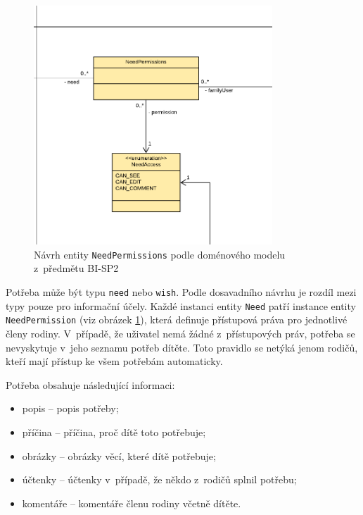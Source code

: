         \begin{figure}\centering
	        \includegraphics[width=0.8\textwidth]{pdfs/NeedPermissions1}
	        \caption[Návrh entity \texttt{NeedPermissions}]{Návrh entity \texttt{NeedPermissions} podle doménového modelu z~předmětu BI-SP2}\label{image:NeedPermissions1}
        \end{figure}
        Potřeba může být typu \verb|need| nebo \verb|wish|. Podle dosavadního návrhu je rozdíl mezi typy pouze pro informační účely. Každé instanci entity \verb|Need| patří instance entity \verb|NeedPermission| (viz obrázek \ref{image:NeedPermissions1}), která definuje přístupová práva pro jednotlivé členy rodiny. V~případě, že uživatel nemá žádné z~přístupových práv, potřeba se nevyskytuje v~jeho seznamu potřeb dítěte. Toto pravidlo se netýká jenom rodičů, kteří mají přístup ke všem potřebám automaticky.
       
       Potřeba obsahuje následující informaci:
        \begin{itemize}
            \setlength\itemsep{0.3em}
            \item popis -- popis potřeby;
            \item příčina -- příčina, proč dítě toto potřebuje;
            \item obrázky -- obrázky věcí, které dítě potřebuje;
            \item účtenky -- účtenky v~případě, že někdo z~rodičů splnil potřebu;
            \item komentáře -- komentáře členu rodiny včetně dítěte.
        \end{itemize}
    
